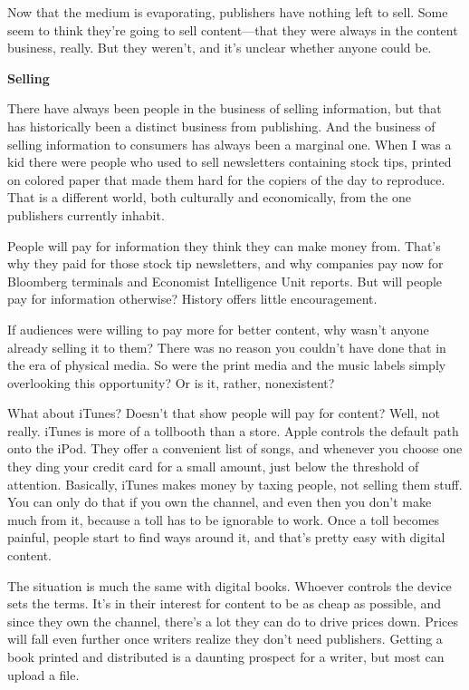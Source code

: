 Now that the medium is evaporating, publishers have nothing left to
sell. Some seem to think they're going to sell content---that they were
always in the content business, really. But they weren't, and it's
unclear whether anyone could be.

\textbf{Selling}

There have always been people in the business of selling information,
but that has historically been a distinct business from publishing. And
the business of selling information to consumers has always been a
marginal one. When I was a kid there were people who used to sell
newsletters containing stock tips, printed on colored paper that made
them hard for the copiers of the day to reproduce. That is a different
world, both culturally and economically, from the one publishers
currently inhabit.

People will pay for information they think they can make money from.
That's why they paid for those stock tip newsletters, and why companies
pay now for Bloomberg terminals and Economist Intelligence Unit reports.
But will people pay for information otherwise? History offers little
encouragement.

If audiences were willing to pay more for better content, why wasn't
anyone already selling it to them? There was no reason you couldn't have
done that in the era of physical media. So were the print media and the
music labels simply overlooking this opportunity? Or is it, rather,
nonexistent?

What about iTunes? Doesn't that show people will pay for content? Well,
not really. iTunes is more of a tollbooth than a store. Apple controls
the default path onto the iPod. They offer a convenient list of songs,
and whenever you choose one they ding your credit card for a small
amount, just below the threshold of attention. Basically, iTunes makes
money by taxing people, not selling them stuff. You can only do that if
you own the channel, and even then you don't make much from it, because
a toll has to be ignorable to work. Once a toll becomes painful, people
start to find ways around it, and that's pretty easy with digital
content.

The situation is much the same with digital books. Whoever controls the
device sets the terms. It's in their interest for content to be as cheap
as possible, and since they own the channel, there's a lot they can do
to drive prices down. Prices will fall even further once writers realize
they don't need publishers. Getting a book printed and distributed is a
daunting prospect for a writer, but most can upload a file.

